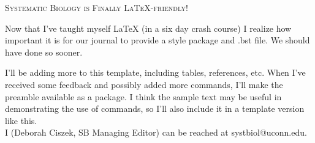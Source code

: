 \documentclass[12pt,letterpaper]{article}
\renewcommand{\section}[1]{%
\bigskip
\begin{center}
\begin{Large}
\normalfont\scshape #1
\medskip
\end{Large}
\end{center}}
\begin{document}
\section{Systematic Biology is Finally \LaTeX-friendly!}

Now that I've taught myself LaTeX (in a six day crash course) I realize how important it is for our journal to provide a style package and .bst file. We should have done so sooner.

I'll be adding more to this template, including tables, references,
etc. When I've received some feedback and possibly added more
commands, I'll make the preamble available as a package. I
think the sample text may be useful in demonstrating the use of
commands, so I'll also include it in a template version like this.\\ I (Deborah Ciszek, SB Managing Editor) can be reached at systbiol@uconn.edu.

 

\end{document}
